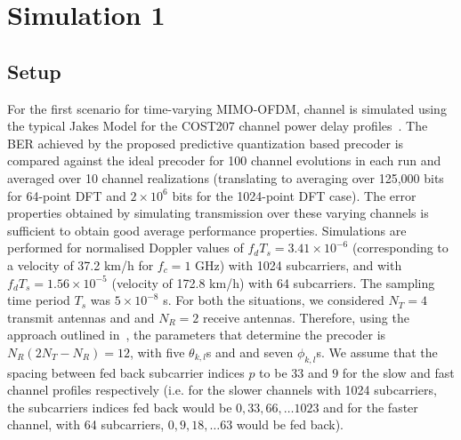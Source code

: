 \documentclass[11pt,a4paper]{report}
\begin{document}
\section{Simulation 1}
\subsection{Setup}
For the first scenario for time-varying MIMO-OFDM, channel is simulated
using the typical Jakes Model for the COST207 channel
power delay profiles~\cite{molisch2006cost259}. The BER achieved by the proposed
predictive quantization based precoder is compared against the
ideal precoder for 100 channel evolutions in each run and
averaged over 10 channel realizations (translating to averaging
over 125,000 bits for 64-point DFT and $2\times 10^6$ bits for the 1024-point DFT case).
The error properties obtained by simulating transmission over these
varying channels is sufficient to obtain good average performance properties.
Simulations are performed for
normalised Doppler values of $f_dT_s = 3.41\times 10^{-6}$ (corresponding
to a velocity of 37.2 km/h for $f_c = 1$ GHz) with 1024 subcarriers, and with
$f_dT_s = 1.56 \times 10^{-5}$ (velocity of 172.8 km/h) with 64
subcarriers. The sampling time period $T_s$ was $5\times10^{-8}$
s. For both the situations, we considered $N_T=4$ transmit antennas
and and $N_R=2$ receive antennas. Therefore, using the approach
outlined in~\cite{4114278}, the parameters that determine the precoder is
$N_{R}(2N_{T} - N_R) = 12$, with five $\theta_{k,l}$s and and seven
$\phi_{k,l}$s. We assume that the spacing between fed back subcarrier
indices $p$ to be $33$ and $9$ for the slow and fast channel profiles
respectively (i.e. for the slower channels with 1024 subcarriers, the
subcarriers indices fed back would be $0, 33, 66, \ldots 1023$ and for
the faster channel, with 64 subcarriers, $0, 9, 18, \ldots 63$ would
be fed back).
\end{document}
